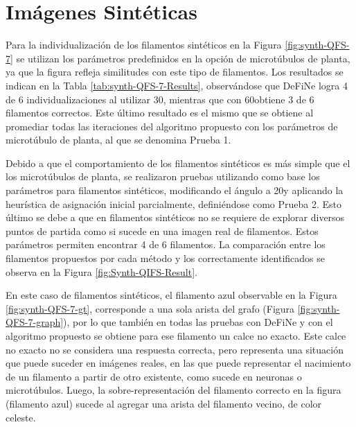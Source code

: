 \section{Im\'agenes Sint\'eticas}

Para la individualizaci\'on de los filamentos sint\'eticos en la Figura \ref{fig:synth-QFS-7} se utilizan los par\'ametros predefinidos en la opci\'on de microt\'ubulos de planta, ya que la figura refleja similitudes con este tipo de filamentos.
Los resultados se indican en la Tabla \ref{tab:synth-QFS-7-Results}, observ\'andose que DeFiNe logra 4 de 6 individualizaciones al utilizar 30\textdegree, mientras que con 60\textdegree obtiene 3 de 6 filamentos correctos. Este \'ultimo resultado es el mismo que se obtiene al promediar todas las iteraciones del algoritmo propuesto con los par\'ametros de microt\'ubulo de planta, al que se denomina Prueba 1.

Debido a que el comportamiento de los filamentos sint\'eticos es m\'as simple que el los microt\'ubulos de planta, se realizaron pruebas utilizando como base los par\'ametros para filamentos sint\'eticos, modificando el \'angulo a 20\textdegree y aplicando la heur\'istica de asignaci\'on inicial parcialmente, defini\'endose como Prueba 2. Esto \'ultimo se debe a que en filamentos sint\'eticos no se requiere de explorar diversos puntos de partida como si sucede en una imagen real de filamentos. Estos par\'ametros permiten encontrar 4 de 6 filamentos. La comparaci\'on entre los filamentos propuestos por cada m\'etodo y los correctamente identificados se observa en la Figura \ref{fig:Synth-QIFS-Result}.


En este caso de filamentos sint\'eticos, el filamento azul observable en la Figura \ref{fig:synth-QFS-7-gt}, corresponde a una sola arista del grafo (Figura \ref{fig:synth-QFS-7-graph}), por lo que tambi\'en en todas las pruebas con DeFiNe y con el algoritmo propuesto se obtiene para ese filamento un calce no exacto. Este calce no exacto no se considera una respuesta correcta, pero representa una situaci\'on que puede suceder en im\'agenes reales, en las que puede representar el nacimiento de un filamento a partir de otro existente, como sucede en neuronas o microt\'ubulos. 
Luego, la sobre-representaci\'on del filamento correcto en la figura (filamento azul) sucede al agregar una arista del filamento vecino, de color celeste.


